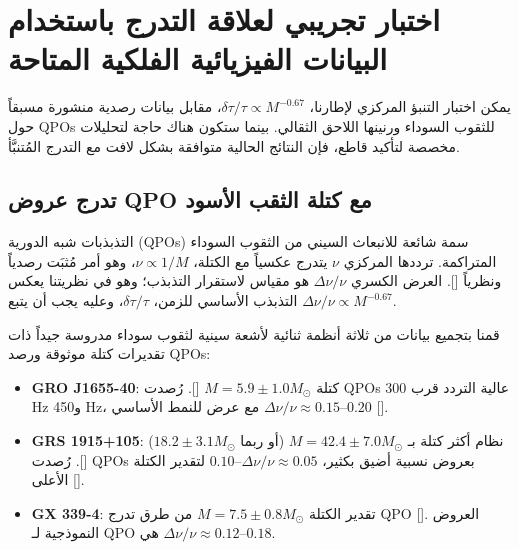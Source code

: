 \documentclass[11pt,a4paper]{article}
\begin{document}
	\section{اختبار تجريبي لعلاقة التدرج باستخدام البيانات الفيزيائية الفلكية المتاحة}
	\label{sec:empirical_test}
	
	يمكن اختبار التنبؤ المركزي لإطارنا، \(\delta\tau/\tau \propto M^{-0.67}\)، مقابل بيانات رصدية منشورة مسبقاً حول QPOs للثقوب السوداء ورنينها اللاحق الثقالي. بينما ستكون هناك حاجة لتحليلات مخصصة لتأكيد قاطع، فإن النتائج الحالية متوافقة بشكل لافت مع التدرج المُتنبَّأ.
	
	\subsection{تدرج عروض QPO مع كتلة الثقب الأسود}
	
	التذبذبات شبه الدورية (QPOs) سمة شائعة للانبعاث السيني من الثقوب السوداء المتراكمة. ترددها المركزي \(\nu\) يتدرج عكسياً مع الكتلة، \(\nu \propto 1/M\)، وهو أمر مُثبَت رصدياً ونظرياً [\cite{Wagoner2001, Schnittman2004}]. العرض الكسري \(\Delta\nu/\nu\) هو مقياس لاستقرار التذبذب؛ وهو في نظريتنا يعكس التذبذب الأساسي للزمن، \(\delta\tau/\tau\)، وعليه يجب أن يتبع \(\Delta\nu/\nu \propto M^{-0.67}\).
	
	قمنا بتجميع بيانات من ثلاثة أنظمة ثنائية لأشعة سينية لثقوب سوداء مدروسة جيداً ذات تقديرات كتلة موثوقة ورصد QPOs:
	
	\begin{itemize}
		\item \textbf{GRO J1655-40}: كتلة \(M = 5.9 \pm 1.0 M_\odot\) [\cite{Wagoner2001}]. رُصدت QPOs عالية التردد قرب 300 Hz و450 Hz، مع عرض للنمط الأساسي \(\Delta\nu/\nu \approx 0.15\)–\(0.20\) [\cite{Strohmayer2001a, Wagoner2001}].
		\item \textbf{GRS 1915+105}: نظام أكثر كتلة بـ \(M = 42.4 \pm 7.0 M_\odot\) (أو ربما \(18.2 \pm 3.1 M_\odot\)) [\cite{Wagoner2001}]. رُصدت QPOs بعروض نسبية أضيق بكثير، \(\Delta\nu/\nu \approx 0.05\)–\(0.10\) لتقدير الكتلة الأعلى [\cite{Strohmayer2001b}].
		\item \textbf{GX 339-4}: تقدير الكتلة \(M = 7.5 \pm 0.8 M_\odot\) من طرق تدرج QPO [\cite{Chen2011}]. العروض النموذجية لـ QPO هي \(\Delta\nu/\nu \approx 0.12\)–\(0.18\).
	\end{itemize}
	
\end{document}
